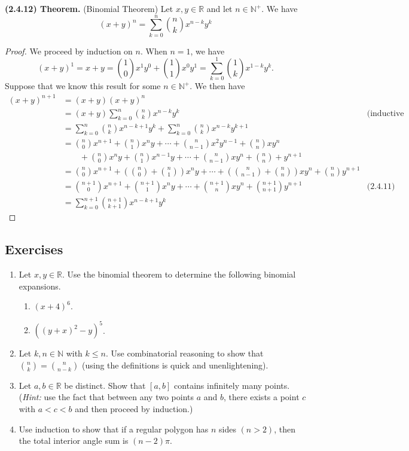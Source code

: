 \documentclass[12pt]{book}
\def\N{{\mathbb{N}}}
\def\R{{\mathbb{R}}}
\def\header #1{\noindent\textbf{#1}}
\begin{document}
\header{(2.4.12) Theorem.} (Binomial Theorem) Let $x,y\in\R$ and let $n\in\N^+$. We have 
\[(x+y)^n=\sum_{k=0}^n\binom{n}{k}x^{n-k}y^k\]

\begin{proof}
We proceed by induction on $n$. When $n=1$, we have 
\[(x+y)^1=x+y=\binom{1}{0}x^1y^0+\binom{1}{1}x^0y^1=\sum_{k=0}^1\binom{1}{k}x^{1-k}y^k.\]
Suppose that we know this result for some $n\in\N^+$. We then have
\begin{align*}
(x+y)^{n+1} & =(x+y)(x+y)^n \\
 & = (x+y)\sum_{k=0}^n\binom{n}{k}x^{n-k}y^k & \text{(inductive hypothesis)}\\
 & = \sum_{k=0}^n\binom{n}{k}x^{n-k+1}y^k+\sum_{k=0}^n\binom{n}{k}x^{n-k}y^{k+1}\\
 & = \binom{n}{0}x^{n+1}+\binom{n}{1}x^ny+\cdots+\binom{n}{n-1}x^2y^{n-1}+\binom{n}{n}xy^n\\ 
 & \qquad + \binom{n}{0}x^ny+\binom{n}{1}x^{n-1}y+\cdots+\binom{n}{n-1}xy^n+\binom{n}{n}+y^{n+1}\\
 & = \binom{n}{0}x^{n+1}+\left(\binom{n}{0}+\binom{n}{1}\right)x^ny+\cdots+\left(\binom{n}{n-1}+\binom{n}{n}\right)xy^n+\binom{n}{n}y^{n+1}\\
 & = \binom{n+1}{0}x^{n+1}+\binom{n+1}{1}x^ny+\cdots+\binom{n+1}{n}xy^n+\binom{n+1}{n+1}y^{n+1} & \text{(2.4.11)}\\
 & = \sum_{k=0}^{n+1}\binom{n+1}{k+1}x^{n-k+1}y^k
\end{align*}
\end{proof}	

\subsection*{Exercises}
\begin{enumerate}
\item Let $x,y\in\R$. Use the binomial theorem to determine the following binomial expansions.
\begin{enumerate}
	\item $(x+4)^6$.
	\item $((y+x)^2-y)^5$.
\end{enumerate}
\item Let $k,n\in\N$ with $k\leq n$. Use combinatorial reasoning to show that $\binom{n}{k}=\binom{n}{n-k}$ (using the definitions is quick and unenlightening).
\item Let $a,b\in\R$ be distinct. Show that $[a,b]$ contains infinitely many points. (\textit{Hint:} use the fact that between any two points $a$ and $b$, there exists a point $c$ with $a<c<b$ and then proceed by induction.)
\item Use induction to show that if a regular polygon has $n$ sides $(n>2)$, then the total interior angle sum is $(n-2)\pi$.
\end{enumerate}
\end{document}

